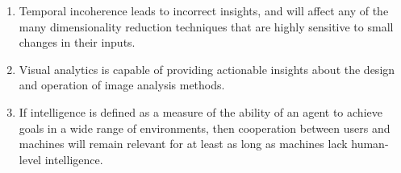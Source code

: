\documentclass[10pt]{article}
\begin{document}
\begin{enumerate}
\item Temporal incoherence leads to incorrect insights, and will affect any of the many dimensionality reduction techniques that are highly sensitive to small changes in their inputs.
\vfill

\item Visual analytics is capable of providing actionable insights about the design and operation of image analysis methods. 
\vfill

\item If intelligence is defined as a measure of the ability of an agent to achieve goals in a wide range of environments, then cooperation between users and machines will remain relevant for at least as long as machines lack human-level intelligence.
\vfill

\end{enumerate}
\end{document}
